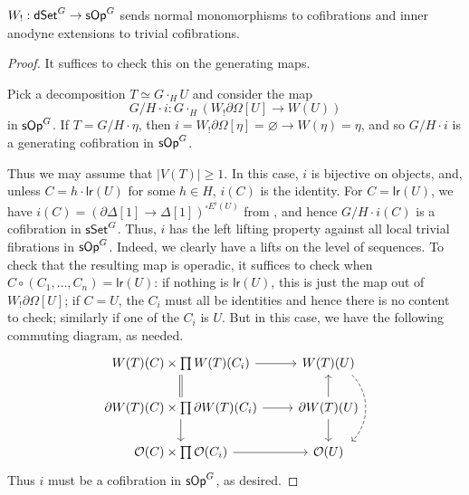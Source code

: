 \documentclass[a4paper,10pt
,draft
]{article}%
\renewcommand{\1}{\eta}%
\begin{document}
\begin{proposition}[{cf. \cite[Prop. 4.5]{CM11}}]
      \label{W!_COF_PROP}
      $W_!: \mathsf{dSet}^G \to \mathsf{sOp}^G$ sends normal monomorphisms to cofibrations and inner anodyne extensions to trivial cofibrations.
\end{proposition}
\begin{proof}
      It suffices to check this on the generating maps.

      Pick a decomposition $T \simeq G \cdot_H U$ and consider the map
      \begin{equation}
            G/H \cdot i: G \cdot_H \left( W_! \partial \Omega[U] \to W(U) \right)      
      \end{equation}
      in $\mathsf{sOp}^G$.
      If $T = G/H \cdot \eta$, then $i = W_! \partial \Omega[\eta] = \varnothing \to W(\eta) = \eta$,
      and so $G/H \cdot i$ is a generating cofibration in $\mathsf{sOp}^G$.

      Thus we may assume that $|V(T)| \geq 1$.
      In this case, $i$ is bijective on objects, and,
      unless $C = h \cdot \mathsf{lr} (U)$ for some $h \in H$, $i(C)$ is the identity.
      For $C = \mathsf{lr}(U)$, we have $i(C) = (\partial \Delta[1] \to \Delta[1])^{\square E^i(U)}$ from \cite[Prop. 4.5]{CM11},
      and hence $G/H \cdot i(C)$ is a cofibration in $\mathsf{sSet}^G$.
      Thus, $i$ has the left lifting property against all local trivial fibrations in $\mathsf{sOp}^G$.
      {\color{OliveGreen}
        Indeed, we clearly have a lifts on the level of sequences.
        To check that the resulting map is operadic, it suffices to check when $C \circ (C_1, \dots, C_n) = \mathsf{lr}(U)$:
        if nothing is $\mathsf{lr}(U)$, this is just the map out of $W_!\partial \Omega[U]$;
        if $C = U$, the $C_i$ must all be identities and hence there is no content to check;
        similarly if one of the $C_i$ is $U$.
        But in this case, we have the following commuting diagram, as needed.
        \begin{equation}
              \begin{tikzcd}
                    W(T)(C) \times \prod W(T)(C_i) \arrow[r] \arrow[d, equal]
                    &
                    W(T)(U) \arrow[shift left = 4, dd, bend left = 45, dashed]
                    \\
                    \partial W(T)(C) \times \prod \partial W(T)(C_i) \arrow[r] \arrow[d]
                    &
                    \partial W(T)(U) \arrow[u] \arrow[d]
                    \\
                    \O(C) \times \prod \O(C_i) \arrow[r]
                    &
                    \O(U)
              \end{tikzcd}
        \end{equation}
      } %
      Thus $i$ must be a cofibration in $\mathsf{sOp}^G$, as desired.


\end{proof}
\end{document}

